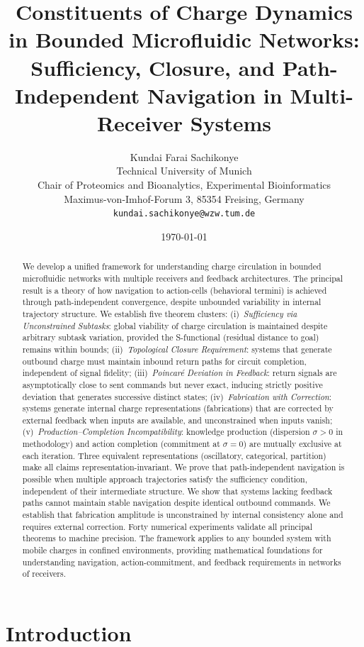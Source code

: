 \documentclass[twocolumn,11pt,a4paper]{article}
\title{\textbf{Constituents of Charge Dynamics in Bounded Microfluidic Networks:\\
Sufficiency, Closure, and Path-Independent Navigation in Multi-Receiver Systems}}
\author{Kundai Farai Sachikonye\\[2pt]
\small Technical University of Munich \\
\small Chair of Proteomics and Bioanalytics, Experimental Bioinformatics\\
\small Maximus-von-Imhof-Forum 3, 85354 Freising, Germany\\
\small \texttt{kundai.sachikonye@wzw.tum.de}}
\date{\today}
\begin{document}
\maketitle

\begin{abstract}
We develop a unified framework for understanding charge circulation in bounded microfluidic networks with multiple receivers and feedback architectures. The principal result is a theory of how navigation to action-cells (behavioral termini) is achieved through path-independent convergence, despite unbounded variability in internal trajectory structure. We establish five theorem clusters: (i)~\emph{Sufficiency via Unconstrained Subtasks}: global viability of charge circulation is maintained despite arbitrary subtask variation, provided the S-functional (residual distance to goal) remains within bounds; (ii)~\emph{Topological Closure Requirement}: systems that generate outbound charge must maintain inbound return paths for circuit completion, independent of signal fidelity; (iii)~\emph{Poincar\'{e} Deviation in Feedback}: return signals are asymptotically close to sent commands but never exact, inducing strictly positive deviation that generates successive distinct states; (iv)~\emph{Fabrication with Correction}: systems generate internal charge representations (fabrications) that are corrected by external feedback when inputs are available, and unconstrained when inputs vanish; (v)~\emph{Production--Completion Incompatibility}: knowledge production (dispersion $\sigma>0$ in methodology) and action completion (commitment at $\sigma=0$) are mutually exclusive at each iteration. Three equivalent representations (oscillatory, categorical, partition) make all claims representation-invariant. We prove that path-independent navigation is possible when multiple approach trajectories satisfy the sufficiency condition, independent of their intermediate structure. We show that systems lacking feedback paths cannot maintain stable navigation despite identical outbound commands. We establish that fabrication amplitude is unconstrained by internal consistency alone and requires external correction. Forty numerical experiments validate all principal theorems to machine precision. The framework applies to any bounded system with mobile charges in confined environments, providing mathematical foundations for understanding navigation, action-commitment, and feedback requirements in networks of receivers.
\end{abstract}

\section{Introduction}
\label{sec:introduction}
\end{document}

